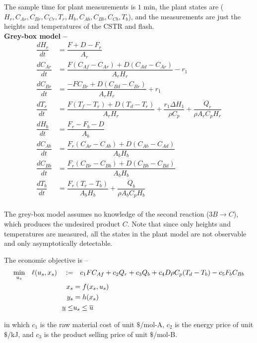 \documentclass{article}
\begin{document}
The sample time for plant measurements is $1$ min, the 
plant states are ($H_r, C_{Ar}, C_{Br}, C_{Cr}, T_r, 
H_b, C_{Ab}, C_{Bb}, C_{Cb}, T_b$), and the measurements are just 
the heights and temperatures of the CSTR and flash. \\

\textbf{Grey-box model -- }
\begin{align*}
  \dfrac{dH_r}{dt} &= \dfrac{F + D -F_r}{A_r}\\
  \dfrac{dC_{Ar}}{dt} &= \dfrac{F(C_{Af} -C_{Ar}) + 
                         D(C_{Ad} -C_{Ar})}{A_rH_r} - r_1 \\
  \dfrac{dC_{Br}}{dt} &= \dfrac{-FC_{Br} + 
                          D(C_{Bd} -C_{Br})}{A_rH_r} + r_1\\
  \dfrac{dT_r}{dt} &= \dfrac{F(T_f - T_r) + D(T_d -T_r)}{A_rH_r} + 
                      \dfrac{r_1\Delta H_1}{\rho C_p} + 
                      \dfrac{Q_r}{\rho A_r C_p H_r}\\
  \dfrac{dH_b}{dt} &= \dfrac{F_r - F_b - D}{A_b} \\
  \dfrac{dC_{Ab}}{dt} &= \dfrac{F_r(C_{Ar} -C_{Ab}) + 
                          D(C_{Ab} -C_{Ad})}{A_bH_b} \\
  \dfrac{dC_{Bb}}{dt} &= \dfrac{F_r(C_{Br} -C_{Bb}) + 
                          D(C_{Bb} -C_{Bd})}{A_bH_b} \\
  \dfrac{dT_b}{dt} &= \dfrac{F_r(T_r - T_b)}{A_bH_b} +
                      \dfrac{Q_b}{\rho A_b C_p H_b}\\
\end{align*}

The grey-box model assumes no knowledge of the second 
reaction ($3B \rightarrow C$), which produces the undesired 
product $C$. Note that since only heights and temperatures are 
measured, all the states in the plant model are 
not observable and only asymptotically detectable. 

The economic objective is -- 
\begin{align*}
  \underset{u_s}{\textnormal{min}} \quad 
  \ell(u_s, x_s) \quad := & \quad c_1FC_{Af} + c_2Q_r + 
                                      c_3Q_b + c_4D\rho C_p(T_d-T_b) - 
                                      c_5F_bC_{Bb} \\
  x_s &= f(x_s, u_s)\\ 
  y_s &= h(x_s) \\
  \underline{u} \leq &u_s \leq \overline{u}
\end{align*}

in which $c_1$ is the raw material cost of unit $\$$/mol-A,
$c_2$ is the energy price of unit $\$$/kJ, 
and $c_3$ is the product selling price of unit $\$$/mol-B.
\end{document}
